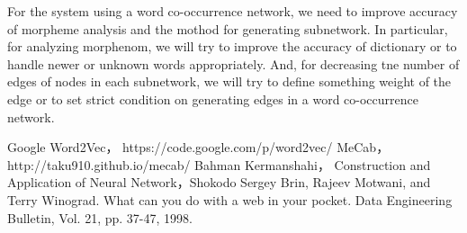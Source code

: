 \documentclass{../style/sig-alternate}
\begin{document}
For the system using a word co-occurrence network, we need to improve accuracy of morpheme analysis and the mothod for generating subnetwork.
In particular, for analyzing morphenom, we will try to improve the accuracy of dictionary or to handle newer or unknown words appropriately. And, for decreasing tne number of edges of nodes in each subnetwork, we will try to define something weight of the edge or to set strict condition on generating edges in a word co-occurrence network.

\begin{thebibliography}{99}

 Google Word2Vec， https://code.google.com/p/word2vec/
 MeCab， http://taku910.github.io/mecab/
 Bahman Kermanshahi， Construction and Application of Neural Network，Shokodo
 Sergey Brin, Rajeev Motwani, and Terry Winograd. What can you do with a
web in your pocket. Data Engineering Bulletin, Vol. 21, pp. 37-47, 1998.

\end{thebibliography}
\end{document}
